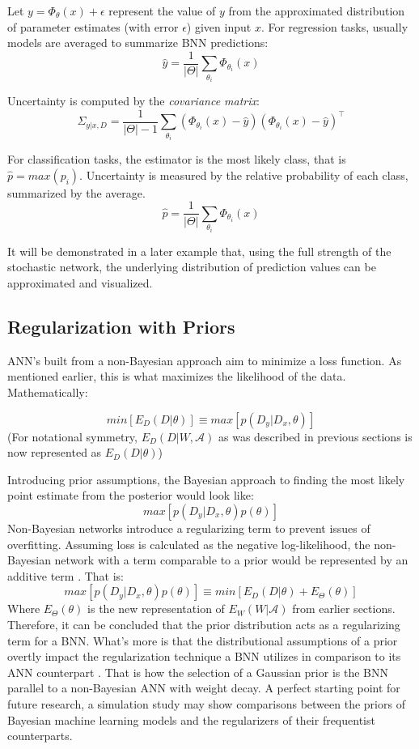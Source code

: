 Let $y = \Phi_{\theta} (x) + \epsilon$ represent the value of $y$ from the approximated distribution of parameter estimates (with error $\epsilon$) given input $x$.
For regression tasks, usually models are averaged to summarize BNN predictions: 
$$
\hat{y} = \frac{1}{|\Theta|} \sum_{\theta_i} \Phi_{\theta_i}(x)
$$

Uncertainty is computed by the \textit{covariance matrix}:
$$
\Sigma_{y|x,D} = \frac{1}{|\Theta|-1} \sum_{\theta_i} (\Phi_{\theta_i}(x) - \hat{y}) (\Phi_{\theta_i}(x) - \hat{y})^\intercal
$$

For classification tasks, the estimator is the most likely class, that is $\hat{p} = max(p_i)$.  Uncertainty is measured by the relative probability of each class, summarized by the average.
$$
\hat{p} = \frac{1}{|\Theta|} \sum_{\theta_i} \Phi_{\theta_i}(x)
$$

It will be demonstrated in a later example that, using the full strength of the stochastic network, the underlying distribution of prediction values can be approximated and visualized. \cite{ziyin2022stochastic}


\subsection{Regularization with Priors}


ANN's built from a non-Bayesian approach aim to minimize a loss function.  As mentioned earlier, this is what maximizes the likelihood of the data.  Mathematically:

$$
min[E_D(D|\theta)] \equiv max[p(D_y|D_x,\theta)]
$$
(For notational symmetry, $E_D(D|W,\mathcal{A})$ as was described in previous sections is now represented as $E_D(D|\theta)$)

Introducing prior assumptions, the Bayesian approach to finding the most likely point estimate from the posterior would look like:
$$
 max[p(D_y|D_x,\theta)p(\theta)]
$$
Non-Bayesian networks introduce a regularizing term to prevent issues of overfitting.  Assuming loss is calculated as the negative log-likelihood, the non-Bayesian network with a term comparable to a prior would be represented by an additive term \cite{Jospin}.  That is:
$$
 max[p(D_y|D_x,\theta)p(\theta)] \equiv min[E_D(D|\theta) + E_{\Theta}(\theta)]
$$
Where $E_{\Theta}(\theta)$ is the new representation of $E_W(W|\mathcal{A})$ from earlier sections.  Therefore, it can be concluded that the prior distribution acts as a regularizing term for a BNN.  What's more is that the distributional assumptions of a prior overtly impact the regularization technique a BNN utilizes in comparison to its ANN counterpart \cite{vladimirova2019understanding}.  That is how the selection of a Gaussian prior %
is the BNN parallel to a non-Bayesian ANN with weight decay.  A perfect starting point for future research, a simulation study may show comparisons between the priors of Bayesian machine learning models and the regularizers of their frequentist counterparts.
